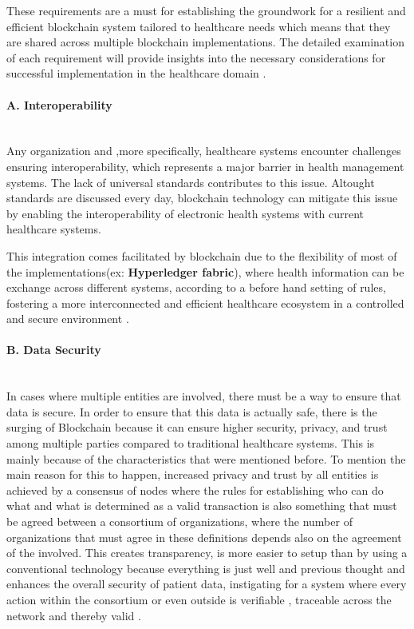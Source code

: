 These requirements are a must for establishing the groundwork for a resilient and efficient blockchain system
 tailored to healthcare needs which means that they are shared across multiple blockchain implementations. 
 The detailed examination of each requirement will provide insights into the necessary considerations for successful 
 implementation in the healthcare domain  \cite{implementation-requirements-blockchain}.

\paragraph{A. Interoperability} \mbox{}\\
Any organization and ,more specifically, healthcare systems encounter challenges ensuring interoperability, 
which represents a major barrier in health management systems. The lack of universal standards contributes to this issue. 
Altought standards are discussed every day,   blockchain technology can mitigate this issue by enabling the interoperability of 
electronic health systems with current healthcare systems.

This integration comes facilitated by blockchain due to the flexibility of most of the implementations(ex: \textbf{Hyperledger fabric}), 
where health information can be exchange across different systems, according to a before hand setting of rules, fostering a more 
interconnected and efficient healthcare ecosystem in a controlled and secure environment \cite{blockchain-utilization-in-healthcare}.

\paragraph{B. Data Security} \mbox{}\\
In cases where multiple entities are involved, there must be a way to ensure that data is secure. In order to ensure that this data 
is actually safe, there is the surging of Blockchain because it can ensure higher security, privacy, and trust among multiple parties 
compared to traditional healthcare systems. This is mainly because of the characteristics that were mentioned before. To mention the 
main reason for this to happen, increased privacy and trust by all entities is achieved by a consensus of nodes where the rules for 
establishing who can do what and what is determined as a valid transaction is also something that must be agreed between a consortium of 
organizations, where the number of organizations that must agree in these definitions depends also on the agreement of the involved. This 
creates transparency, is more easier to setup than by using a conventional technology because everything is just well and previous thought 
and enhances the overall security of patient data, instigating for a system where every action within the consortium or even outside is 
verifiable , traceable across the network and thereby valid \cite{blockchain-utilization-in-healthcare}.

